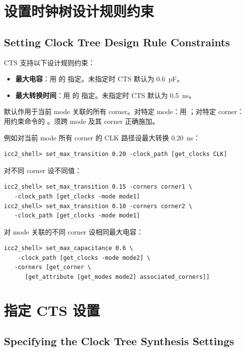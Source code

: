 \section{设置时钟树设计规则约束}
\subsection*{Setting Clock Tree Design Rule Constraints}

CTS 支持以下设计规则约束：
\begin{itemize}
  \item \textbf{最大电容}：用  的  指定。未指定时 CTS 默认为 0.6~pF。
  \item \textbf{最大转换时间}：用  的  指定。未指定时 CTS 默认为 0.5~ns。
\end{itemize}

默认作用于当前 mode 关联的所有 corner。对特定 mode：用 ；对特定 corner：用约束命令的 。须跨 mode 及其 corner 正确施加。

例如对当前 mode 所有 corner 的 CLK 路径设最大转换 0.20~ns：
\begin{lstlisting}
icc2_shell> set_max_transition 0.20 -clock_path [get_clocks CLK]
\end{lstlisting}

对不同 corner 设不同值：
\begin{lstlisting}
icc2_shell> set_max_transition 0.15 -corners corner1 \
   -clock_path [get_clocks -mode mode1]
icc2_shell> set_max_transition 0.10 -corners corner2 \
   -clock_path [get_clocks -mode mode1]
\end{lstlisting}

对 mode 关联的不同 corner 设相同最大电容：
\begin{lstlisting}
icc2_shell> set_max_capacitance 0.6 \
    -clock_path [get_clocks -mode mode2] \
   -corners [get_corner \
      [get_attribute [get_modes mode2] associated_corners]]
\end{lstlisting}

\section{指定 CTS 设置}
\subsection*{Specifying the Clock Tree Synthesis Settings}

